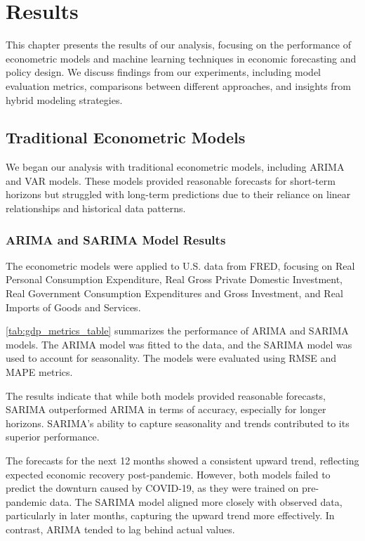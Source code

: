 \chapter{Results}
\label{sec:results}

This chapter presents the results of our analysis, focusing on the performance of econometric models and machine learning techniques in economic forecasting and policy design. We discuss findings from our experiments, including model evaluation metrics, comparisons between different approaches, and insights from hybrid modeling strategies.

\section{Traditional Econometric Models}
\label{subsec:traditional_econometric_models}

We began our analysis with traditional econometric models, including ARIMA and VAR models. These models provided reasonable forecasts for short-term horizons but struggled with long-term predictions due to their reliance on linear relationships and historical data patterns.

\subsection{ARIMA and SARIMA Model Results}
\label{subsubsec:arima_results}

The econometric models were applied to U.S. data from FRED, focusing on Real Personal Consumption Expenditure, Real Gross Private Domestic Investment, Real Government Consumption Expenditures and Gross Investment, and Real Imports of Goods and Services.

\ref{tab:gdp_metrics_table} summarizes the performance of ARIMA and SARIMA models. The ARIMA model was fitted to the data, and the SARIMA model was used to account for seasonality. The models were evaluated using RMSE and MAPE metrics.



The results indicate that while both models provided reasonable forecasts, SARIMA outperformed ARIMA in terms of accuracy, especially for longer horizons. SARIMA's ability to capture seasonality and trends contributed to its superior performance.

The forecasts for the next 12 months showed a consistent upward trend, reflecting expected economic recovery post-pandemic. However, both models failed to predict the downturn caused by COVID-19, as they were trained on pre-pandemic data. The SARIMA model aligned more closely with observed data, particularly in later months, capturing the upward trend more effectively. In contrast, ARIMA tended to lag behind actual values.

